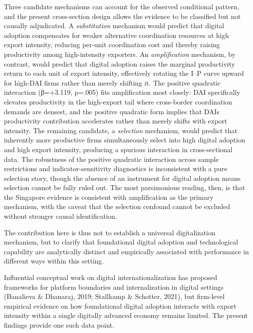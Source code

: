 \documentclass[12pt,a4paper]{article}
\begin{document}
Three candidate mechanisms can account for the observed conditional
pattern, and the present cross-section design allows the evidence to be
classified but not causally adjudicated. A \emph{substitution} mechanism
would predict that digital adoption compensates for weaker alternative
coordination resources at high export intensity, reducing per-unit
coordination cost and thereby raising productivity among high-intensity
exporters. An \emph{amplification} mechanism, by contrast, would predict
that digital adoption raises the marginal productivity return to each
unit of export intensity, effectively rotating the I--P curve upward for
high-DAI firms rather than merely shifting it. The positive quadratic
interaction (β=+3.119, p=.005) fits amplification most closely: DAI
specifically elevates productivity in the high-export tail where
cross-border coordination demands are densest, and the positive
quadratic form implies that DAI\textquotesingle s productivity
contribution accelerates rather than merely shifts with export
intensity. The remaining candidate, a \emph{selection} mechanism, would
predict that inherently more productive firms simultaneously select into
high digital adoption and high export intensity, producing a spurious
interaction in cross-sectional data. The robustness of the positive
quadratic interaction across sample restrictions and
indicator-sensitivity diagnostics is inconsistent with a pure selection
story, though the absence of an instrument for digital adoption means
selection cannot be fully ruled out. The most parsimonious reading,
then, is that the Singapore evidence is consistent with amplification as
the primary mechanism, with the caveat that the selection confound
cannot be excluded without stronger causal identification.

The contribution here is thus not to establish a universal
digitalization mechanism, but to clarify that foundational digital
adoption and technological capability are analytically distinct and
empirically associated with performance in different ways within this
setting.

Influential conceptual work on digital internationalization has proposed
frameworks for platform boundaries and internalization in digital
settings (Banalieva \& Dhanaraj, 2019; Stallkamp \& Schotter, 2021), but
firm-level empirical evidence on how foundational digital adoption
interacts with export intensity within a single digitally advanced
economy remains limited. The present findings provide one such data
point.
\end{document}
